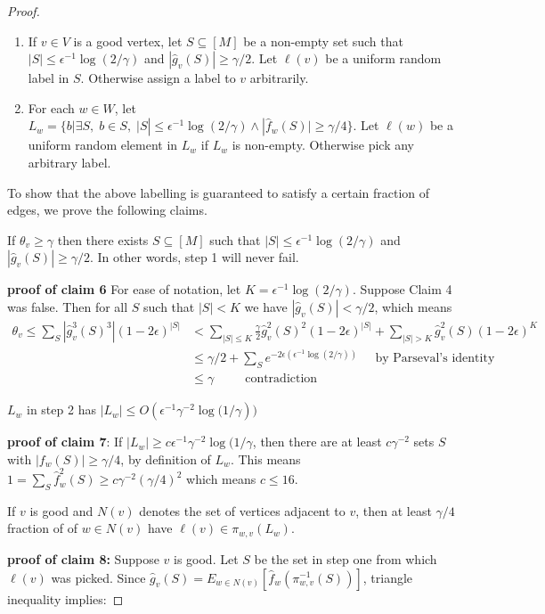\documentclass{article}
\newcommand{\1}{\mathbbm{1}}
\begin{document}
\begin{proof}
\begin{enumerate}[1)]
    \item If $v\in V$ is a good vertex, let $S\subseteq [M]$ be a non-empty set such that $|S|\leq \epsilon^{-1}\log(2/\gamma)$ and $|\hat{g}_v(S)|\geq \gamma/2$. Let $\ell(v)$ be a uniform random label in $S$. Otherwise assign a label to $v$ arbitrarily.
    \item For each $w\in W$, let $L_w=\{b| \exists S,\; b\in S,\; |S|\leq \epsilon^{-1}\log(2/\gamma)\wedge |\hat{f}_w(S)|\geq \gamma/4\}$. Let $\ell(w)$ be a uniform random element in $L_w$ if $L_w$ is non-empty. Otherwise pick any arbitrary label.
\end{enumerate}
To show that the above labelling is guaranteed to satisfy a certain fraction of edges, we prove the following claims.
\begin{claim}
If $\theta_v \geq \gamma$ then there exists $S\subseteq [M]$ such that $|S|\leq \epsilon^{-1}\log{(2/\gamma)}$ and $|\hat{g}_v(S)| \geq \gamma/2$. In other words, step 1 will never fail.
\end{claim}
\textbf{proof of claim 6} For ease of notation, let $K = \epsilon^{-1}\log{(2/\gamma)}$. Suppose Claim 4 was false. Then for all $S$ such that $|S| < K$ we have $|\hat{g}_v(S)| < \gamma/2$, which means
\begin{align*}
    \theta_v \leq \sum_{S}|\hat{g}_v^3(S)^3|(1-2\epsilon)^{|S|}&< \sum_{|S|\leq K}\frac{\gamma}{2}\hat{g}_v^2(S)^2(1-2\epsilon)^{|S|} + \sum_{|S| > K}\hat{g}_v^2(S)(1-2\epsilon)^{K}\\
    &\leq \gamma/2 + \sum_{S}e^{-2\epsilon(\epsilon^{-1}\log{(2/\gamma)})}\;\;\;\;\;\text{by Parseval's identity}\\
    &\leq \gamma\;\;\;\;\;\;\;\;\;\text{contradiction}
\end{align*}
\begin{claim} $L_w$ in step 2 has $|L_w|\leq O(\epsilon^{-1}\gamma^{-2}\log{(1/\gamma}))$
\end{claim}
\textbf{proof of claim 7}: If $|L_w|\geq c\epsilon^{-1}\gamma^{-2}\log{(1/\gamma}$, then there are at least $c\gamma^{-2}$ sets $S$ with $|f_w(S)|\geq \gamma/4$, by definition of $L_w$. This means $1 = \sum_S\hat{f}_w^2(S)\geq c\gamma^{-2}(\gamma/4)^2$ which means $c\leq 16$.
\begin{claim}
If $v$ is good and $N(v)$ denotes the set of vertices adjacent to $v$, then at least $\gamma/4$ fraction of of $w\in N(v)$ have $\ell(v)\in \pi_{w,v}(L_w)$.
\end{claim}
\textbf{proof of claim 8:} Suppose $v$ is good. Let $S$
 be the set in step one from which $\ell(v)$ was picked. Since $\hat{g}_v(S) = E_{w\in N(v)}[\hat{f}_w(\pi_{w,v}^{-1}(S))]$, triangle inequality implies:

\end{proof}
\end{document}
